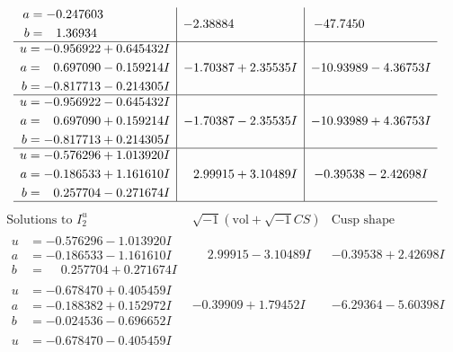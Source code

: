 \documentclass[1p]{elsarticle_modified}
\theoremstyle{definition}
\newcommand{\I}{\sqrt{-1}}
\begin{document}
$$\begin{array}{c|c|c}
\begin{aligned}
a &= -0.247603\phantom{ +0.000000I} \\
b &= \phantom{-}1.36934\phantom{ +0.000000I}\end{aligned}
 & -2.38884\phantom{ +0.000000I} & -47.7450\phantom{ +0.000000I} \\ \hline\begin{aligned}
u &= -0.956922 + 0.645432 I \\
a &= \phantom{-}0.697090 - 0.159214 I \\
b &= -0.817713 - 0.214305 I\end{aligned}
 & -1.70387 + 2.35535 I & -10.93989 - 4.36753 I \\ \hline\begin{aligned}
u &= -0.956922 - 0.645432 I \\
a &= \phantom{-}0.697090 + 0.159214 I \\
b &= -0.817713 + 0.214305 I\end{aligned}
 & -1.70387 - 2.35535 I & -10.93989 + 4.36753 I \\ \hline\begin{aligned}
u &= -0.576296 + 1.013920 I \\
a &= -0.186533 + 1.161610 I \\
b &= \phantom{-}0.257704 - 0.271674 I\end{aligned}
 & \phantom{-}2.99915 + 3.10489 I & -0.39538 - 2.42698 I\\
 \hline 
 \end{array}$$\newpage$$\begin{array}{c|c|c}  
\text{Solutions to }I^u_{2}& \I (\text{vol} + \sqrt{-1}CS) & \text{Cusp shape}\\
 \hline 
\begin{aligned}
u &= -0.576296 - 1.013920 I \\
a &= -0.186533 - 1.161610 I \\
b &= \phantom{-}0.257704 + 0.271674 I\end{aligned}
 & \phantom{-}2.99915 - 3.10489 I & -0.39538 + 2.42698 I \\ \hline\begin{aligned}
u &= -0.678470 + 0.405459 I \\
a &= -0.188382 + 0.152972 I \\
b &= -0.024536 - 0.696652 I\end{aligned}
 & -0.39909 + 1.79452 I & -6.29364 - 5.60398 I \\ \hline\begin{aligned}
u &= -0.678470 - 0.405459 I \\

\end{aligned}
\end{array}$$
\end{document}
